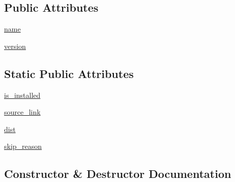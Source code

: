 \subsection*{Public Attributes}
\begin{DoxyCompactItemize}
\item 
\hyperlink{classpip_1_1__internal_1_1resolution_1_1resolvelib_1_1candidates_1_1AlreadyInstalledCandidate_a3f8d63ad3607d74e579182a2d8118837}{name}
\item 
\hyperlink{classpip_1_1__internal_1_1resolution_1_1resolvelib_1_1candidates_1_1AlreadyInstalledCandidate_ac52123643f6b9f461f665e9b3d3b1d81}{version}
\end{DoxyCompactItemize}
\subsection*{Static Public Attributes}
\begin{DoxyCompactItemize}
\item 
\hyperlink{classpip_1_1__internal_1_1resolution_1_1resolvelib_1_1candidates_1_1AlreadyInstalledCandidate_a801f3b2c8ea2597abdc8ba7b8d9e0e63}{is\+\_\+installed}
\item 
\hyperlink{classpip_1_1__internal_1_1resolution_1_1resolvelib_1_1candidates_1_1AlreadyInstalledCandidate_ac39f75502daa066fd6259e1fbbf198a8}{source\+\_\+link}
\item 
\hyperlink{classpip_1_1__internal_1_1resolution_1_1resolvelib_1_1candidates_1_1AlreadyInstalledCandidate_ac902c1edd7b8f28560c245c42fe471e0}{dist}
\item 
\hyperlink{classpip_1_1__internal_1_1resolution_1_1resolvelib_1_1candidates_1_1AlreadyInstalledCandidate_a89077fc1224665629aec66bc62072e99}{skip\+\_\+reason}
\end{DoxyCompactItemize}


\subsection{Constructor \& Destructor Documentation}
\mbox{\label{classpip_1_1__internal_1_1resolution_1_1resolvelib_1_1candidates_1_1AlreadyInstalledCandidate_a3261e5891a5b2a1c5a38ffeb9a7d2d99}} 
